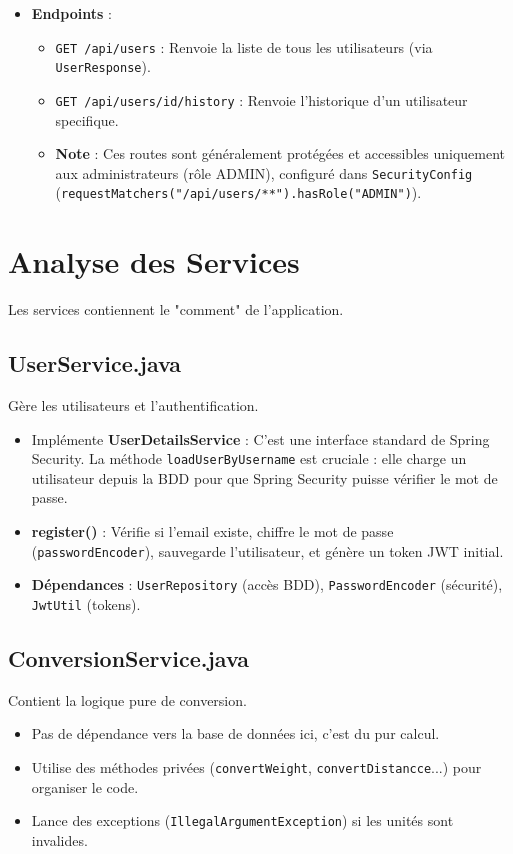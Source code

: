 \documentclass{article}
\begin{document}
\begin{itemize}
    \item \textbf{Endpoints} :
    \begin{itemize}
        \item \texttt{GET /api/users} : Renvoie la liste de tous les utilisateurs (via \texttt{UserResponse}).
        \item \texttt{GET /api/users/{id}/history} : Renvoie l'historique d'un utilisateur specifique.
        \item \textbf{Note} : Ces routes sont généralement protégées et accessibles uniquement aux administrateurs (rôle ADMIN), configuré dans \texttt{SecurityConfig} (\texttt{requestMatchers("/api/users/**").hasRole("ADMIN")}).
    \end{itemize}
\end{itemize}

\section{Analyse des Services}

Les services contiennent le "comment" de l'application.

\subsection{UserService.java}
Gère les utilisateurs et l'authentification.
\begin{itemize}
    \item Implémente \textbf{UserDetailsService} : C'est une interface standard de Spring Security. La méthode \texttt{loadUserByUsername} est cruciale : elle charge un utilisateur depuis la BDD pour que Spring Security puisse vérifier le mot de passe.
    \item \textbf{register()} : Vérifie si l'email existe, chiffre le mot de passe (\texttt{passwordEncoder}), sauvegarde l'utilisateur, et génère un token JWT initial.
    \item \textbf{Dépendances} : \texttt{UserRepository} (accès BDD), \texttt{PasswordEncoder} (sécurité), \texttt{JwtUtil} (tokens).
\end{itemize}

\subsection{ConversionService.java}
Contient la logique pure de conversion.
\begin{itemize}
    \item Pas de dépendance vers la base de données ici, c'est du pur calcul.
    \item Utilise des méthodes privées (\texttt{convertWeight}, \texttt{convertDistancce}...) pour organiser le code.
    \item Lance des exceptions (\texttt{IllegalArgumentException}) si les unités sont invalides.
\end{itemize}
\end{document}
